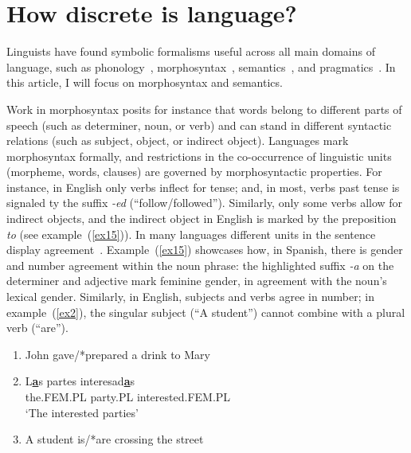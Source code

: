 \section{How discrete is language?}
\label{sec:how-discr-lang}

Linguists have found symbolic formalisms useful across all main domains of language, such as phonology~\cite{chomsky1968sound,PrinceSmolensky1993}, morphosyntax~\cite{Chomsky1957,bresnan1982mental,Langacker1987,pollard1994head,goldberg95}, semantics~\cite{montague74:EFL,partee+90,pustejovsky95}, and pragmatics~\cite{Grice1989,sperber-wilson95}.
In this article, I will focus on morphosyntax and semantics.

Work in morphosyntax posits for instance that words belong to different parts of speech (such as determiner, noun, or verb) and can stand in different syntactic relations (such as subject, object, or indirect object).
Languages mark morphosyntax formally, and restrictions in the co-occurrence of linguistic units (morpheme, words, clauses) are governed by morphosyntactic properties.
For instance, in English only verbs inflect for tense; and, in most, verbs past tense is signaled ty the suffix \textit{-ed} (``follow/followed'').
Similarly, only some verbs allow for indirect objects, and the indirect object in English is marked by the preposition \textit{to} (see example~(\ref{ex15})).
In many languages different units in the sentence display agreement~\cite{wechsler2003many}.
Example~(\ref{ex15}) showcases how, in Spanish, there is gender and number agreement within the noun phrase: the highlighted suffix {\textit{-a}} on the determiner and adjective mark feminine gender, in agreement with the noun's lexical gender.
Similarly, in English, subjects and verbs agree in number; in example~(\ref{ex2}), the singular subject (``A student'') cannot combine with a plural verb (``are'').

\renewcommand{\labelenumi}{(\theenumi)}
\begin{enumerate}
\item \label{ex15} John gave/*prepared a drink to Mary
\item \label{ex1} L\textbf{\underline{a}}s partes interesad\textbf{\underline{a}}s\\
  the.FEM.PL party.PL interested.FEM.PL\\
  `The interested parties'
\item \label{ex2} A student is/*are crossing the street
\end{enumerate}

